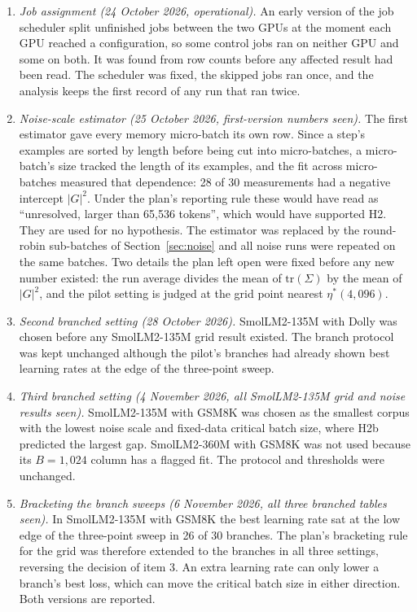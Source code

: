 \documentclass[10pt]{article}
\begin{document}
\begin{enumerate}
\item \emph{Job assignment (24 October 2026, operational).} An early version of the job scheduler split unfinished jobs between the two GPUs at the moment each GPU reached a configuration, so some control jobs ran on neither GPU and some on both. It was found from row counts before any affected result had been read. The scheduler was fixed, the skipped jobs ran once, and the analysis keeps the first record of any run that ran twice.
\item \emph{Noise-scale estimator (25 October 2026, first-version numbers seen).} The first estimator gave every memory micro-batch its own row. Since a step's examples are sorted by length before being cut into micro-batches, a micro-batch's size tracked the length of its examples, and the fit across micro-batches measured that dependence: 28 of 30 measurements had a negative intercept $|G|^2$. Under the plan's reporting rule these would have read as ``unresolved, larger than 65,536 tokens'', which would have supported H2. They are used for no hypothesis. The estimator was replaced by the round-robin sub-batches of Section~\ref{sec:noise} and all noise runs were repeated on the same batches. Two details the plan left open were fixed before any new number existed: the run average divides the mean of $\mathrm{tr}(\Sigma)$ by the mean of $|G|^2$, and the pilot setting is judged at the grid point nearest $\eta^*(4{,}096)$.
\item \emph{Second branched setting (28 October 2026).} SmolLM2-135M with Dolly was chosen before any SmolLM2-135M grid result existed. The branch protocol was kept unchanged although the pilot's branches had already shown best learning rates at the edge of the three-point sweep.
\item \emph{Third branched setting (4 November 2026, all SmolLM2-135M grid and noise results seen).} SmolLM2-135M with GSM8K was chosen as the smallest corpus with the lowest noise scale and fixed-data critical batch size, where H2b predicted the largest gap. SmolLM2-360M with GSM8K was not used because its $B = 1{,}024$ column has a flagged fit. The protocol and thresholds were unchanged.
\item \emph{Bracketing the branch sweeps (6 November 2026, all three branched tables seen).} In SmolLM2-135M with GSM8K the best learning rate sat at the low edge of the three-point sweep in 26 of 30 branches. The plan's bracketing rule for the grid was therefore extended to the branches in all three settings, reversing the decision of item 3. An extra learning rate can only lower a branch's best loss, which can move the critical batch size in either direction. Both versions are reported.

\end{enumerate}
\end{document}
